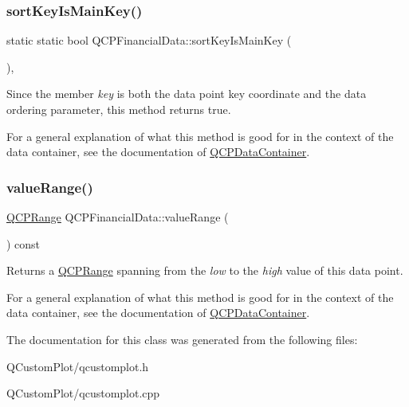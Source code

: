 \subsubsection{\texorpdfstring{sort\+Key\+Is\+Main\+Key()}{sortKeyIsMainKey()}}
{\footnotesize\ttfamily static static bool Q\+C\+P\+Financial\+Data\+::sort\+Key\+Is\+Main\+Key (\begin{DoxyParamCaption}{ }\end{DoxyParamCaption})\hspace{0.3cm}{\ttfamily [inline]}, {\ttfamily [static]}}

Since the member {\itshape key} is both the data point key coordinate and the data ordering parameter, this method returns true.

For a general explanation of what this method is good for in the context of the data container, see the documentation of \mbox{\hyperlink{class_q_c_p_data_container}{Q\+C\+P\+Data\+Container}}. \mbox{\label{class_q_c_p_financial_data_a164d5584eeeb9ba48b4b595ac2ac7fcf}} 
\subsubsection{\texorpdfstring{value\+Range()}{valueRange()}}
{\footnotesize\ttfamily \mbox{\hyperlink{class_q_c_p_range}{Q\+C\+P\+Range}} Q\+C\+P\+Financial\+Data\+::value\+Range (\begin{DoxyParamCaption}{ }\end{DoxyParamCaption}) const\hspace{0.3cm}{\ttfamily [inline]}}

Returns a \mbox{\hyperlink{class_q_c_p_range}{Q\+C\+P\+Range}} spanning from the {\itshape low} to the {\itshape high} value of this data point.

For a general explanation of what this method is good for in the context of the data container, see the documentation of \mbox{\hyperlink{class_q_c_p_data_container}{Q\+C\+P\+Data\+Container}}. 

The documentation for this class was generated from the following files\+:\begin{DoxyCompactItemize}
\item 
Q\+Custom\+Plot/qcustomplot.\+h\item 
Q\+Custom\+Plot/qcustomplot.\+cpp\end{DoxyCompactItemize}
